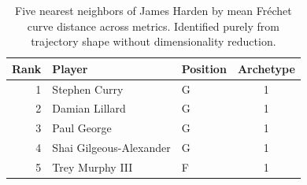 \begin{table}[htbp]
  \centering\small
  \begin{tabular}{rllc}
    \toprule
    Rank & Player & Position & Archetype \\
    \midrule
    1 & Stephen Curry & G & 1 \\
    2 & Damian Lillard & G & 1 \\
    3 & Paul George & G & 1 \\
    4 & Shai Gilgeous-Alexander & G & 1 \\
    5 & Trey Murphy III & F & 1 \\
    \bottomrule
  \end{tabular}
  \caption{Five nearest neighbors of James Harden by mean Fr\'{e}chet curve distance across metrics. Identified purely from trajectory shape without dimensionality reduction.}
  \label{tab:James_Harden_frechet_curve_neighbors}
\end{table}

